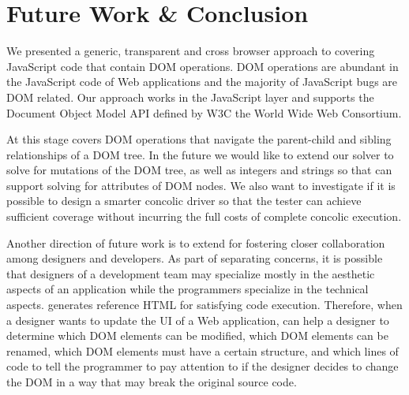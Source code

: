 \section{Future Work \& Conclusion}
We presented a generic, transparent and cross browser approach to covering JavaScript code that contain DOM operations.  
DOM operations are abundant in the JavaScript code of Web applications and the majority of JavaScript bugs are DOM related.  
Our approach works in the JavaScript layer and supports the Document Object Model API defined by W3C the World Wide Web Consortium.  

At this stage \tool covers DOM operations that navigate the parent-child and sibling relationships of a DOM tree.  
In the future we would like to extend our solver to solve for mutations of the DOM tree, as well as integers and strings so that \tool can support solving for attributes of DOM nodes.    
We also want to investigate if it is possible to design a smarter concolic driver so that the tester can achieve sufficient coverage without incurring the full costs of complete concolic execution.

Another direction of future work is to extend \tool for fostering closer collaboration among designers and developers.
As part of separating concerns, it is possible that designers of a development team may specialize mostly in the aesthetic aspects of an application while the programmers specialize in the technical aspects.  
\tool generates reference HTML for satisfying code execution.
Therefore, when a designer wants to update the UI of a Web application, \tool can help a designer to determine 
which DOM elements can be modified, 
which DOM elements can be renamed, 
which DOM elements must have a certain structure, 
and which lines of code to tell the programmer to pay attention to if the designer decides to change the DOM in a way that may break the original source code.  

